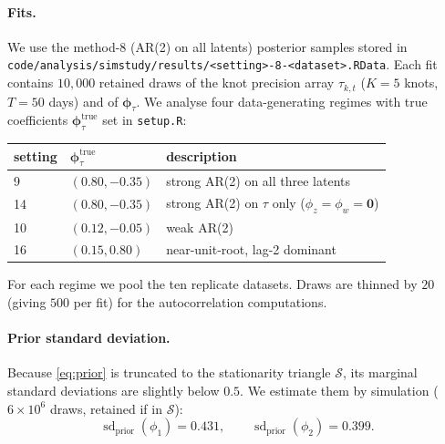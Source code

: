 \documentclass[11pt]{article}
\theoremstyle{definition}
\newcommand{\sd}{\operatorname{sd}}
\newcommand{\Stab}{\mathcal{S}}
\newcommand{\phitau}{\bm{\phi}_\tau}
\newcommand{\code}[1]{\texttt{#1}}
\begin{document}
\paragraph{Fits.} We use the method-8 (AR(2) on all latents) posterior samples
stored in \code{code/analysis/simstudy/results/<setting>-8-<dataset>.RData}. Each
fit contains $10{,}000$ retained draws of the knot precision array
$\tau_{k,t}$ ($K=5$ knots, $T=50$ days) and of $\phitau$. We analyse four
data-generating regimes with true coefficients
$\phitau^{\text{true}}$ set in \code{setup.R}:
\begin{center}\small
\begin{tabular}{lll}
\toprule
setting & $\phitau^{\text{true}}$ & description \\
\midrule
9  & $(0.80,-0.35)$ & strong AR(2) on all three latents \\
14 & $(0.80,-0.35)$ & strong AR(2) on $\tau$ only ($\phi_z=\phi_w=\bm 0$) \\
10 & $(0.12,-0.05)$ & weak AR(2) \\
16 & $(0.15, 0.80)$ & near-unit-root, lag-2 dominant \\
\bottomrule
\end{tabular}
\end{center}
For each regime we pool the ten replicate datasets. Draws are thinned by $20$
(giving $500$ per fit) for the autocorrelation computations.

\paragraph{Prior standard deviation.} Because \eqref{eq:prior} is truncated to the
stationarity triangle $\Stab$, its marginal standard deviations are slightly below
$0.5$. We estimate them by simulation ($6\times10^6$ draws, retained if in
$\Stab$):
\[
\sd_{\text{prior}}(\phi_1)=0.431,\qquad \sd_{\text{prior}}(\phi_2)=0.399 .
\]
\end{document}
